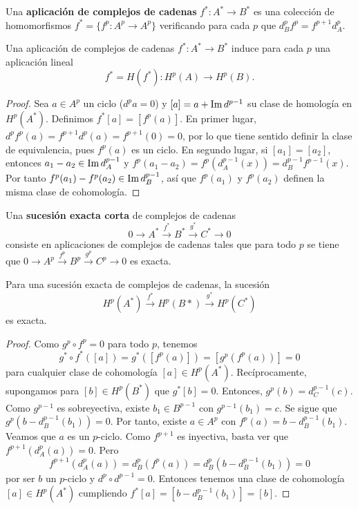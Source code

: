\documentclass[CV.tex]{subfiles}
\begin{document}
\begin{defi}
Una \textbf{aplicación de complejos de cadenas} $f^*:A^*\to B^*$ es una colección de homomorfismos $f^*=\{f^p:A^p\to A^p\}$ verificando para cada $p$ que $d_B^pf^p=f^{p+1}d_A^p$. 
\end{defi}

\begin{lemma}
Una aplicación de complejos de cadenas $f^*:A^*\to B^*$ induce para cada $p$ una aplicación lineal 
\[
f^*=H(f^*):H^p(A)\to H^p(B).
\]
\end{lemma}
\begin{proof}
Sea $a\in A^p$ un ciclo ($d^pa=0$) y $[a]=a+\operatorname{Im}{d^{p-1}}$ su clase de homología en $H^p(A^*)$. Definimos $f^*[a]=[f^p(a)]$. En primer lugar, $d^pf^p(a)=f^{p+1}d^p(a)=f^{p+1}(0)=0$, por lo que tiene sentido definir la clase de equivalencia, pues $f^p(a)$ es un ciclo. En segundo lugar, si $[a_1]=[a_2]$, entonces $a_1-a_2\in\operatorname{Im}{d_A^{p-1}}$ y $f^p(a_1-a_2)=f^p(d_A^{p-1}(x))=d_B^{p-1}f^{p-1}(x)$. Por tanto $f^p(a_1)-f^p(a_2)\in\operatorname{Im}{d_B^{p-1}}$, así que $f^p(a_1)$ y $f^p(a_2)$ definen la misma clase de cohomología.
\end{proof}

\begin{defi}
Una \textbf{sucesión exacta corta} de complejos de cadenas
\[
0\to A^*\overset{f^*}{\to}B^*\overset{g^*}{\to}C^*\to 0
\]
consiste en aplicaciones de complejos de cadenas tales que para todo $p$ se tiene que $0\to A^p\overset{f^p}{\to}B^p\overset{g^p}{\to}C^p\to 0$ es exacta.
\end{defi}

\begin{lemma}\label{lema1}
Para una sucesión exacta de complejos de cadenas, la sucesión
\[
H^p(A^*)\overset{f^*}{\to}H^p(B*)\overset{g^*}{\to}H^p(C^*)
\]
es exacta.
\end{lemma}
\begin{proof}
Como $g^p\circ f^p=0$ para todo $p$, tenemos
\[
g^*\circ f^*([a])=g^*([f^p(a)])=[g^p(f^p(a))]=0
\]
para cualquier clase de cohomología $[a]\in H^p(A^*)$. Recíprocamente, supongamos para $[b]\in H^p(B^*)$ que $g^*[b]=0$. Entonces, $g^p(b)=d_C^{p-1}(c)$. Como $g^{p-1}$ es sobreyectiva, existe $b_1\in B^{p-1}$ con $g^{p-1}(b_1)=c$. Se sigue que $g^p(b-d_B^{p-1}(b_1))=0$. Por tanto, existe $a\in A^p$ con $f^p(a)=b-d_B^{p-1}(b_1)$. Veamos que $a$ es un $p$-ciclo. Como $f^{p+1}$ es inyectiva, basta ver que $f^{p+1}(d_A^p(a))=0$. Pero
\[
f^{p+1}(d_A^p(a))=d_B^p(f^p(a))=d_B^p(b-d_B^{p-1}(b_1))=0
\]
por ser $b$ un $p$-ciclo y $d^p\circ d^{p-1}=0$. Entonces tenemos una clase de cohomología $[a]\in H^p(A^*)$ cumpliendo $f^*[a]=[b-d_B^{p-1}(b_1)]=[b]$.

\end{proof}
\end{document}

